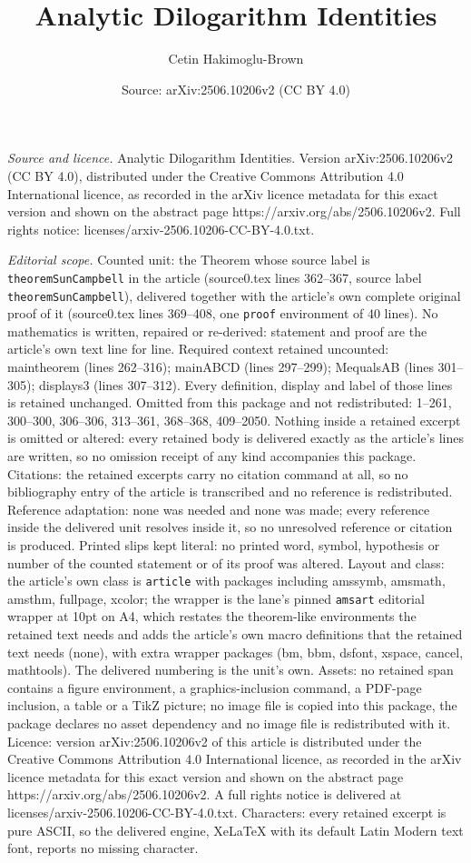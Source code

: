 \documentclass[10pt,a4paper]{amsart}
\title[Analytic Dilogarithm Identities]{Analytic Dilogarithm Identities}
\author{Cetin Hakimoglu-Brown}
\date{Source: arXiv:2506.10206v2 (CC BY 4.0)}
\begin{document}
\maketitle

\noindent\emph{Source and licence.} Analytic Dilogarithm Identities. Version arXiv:2506.10206v2 (CC BY 4.0), distributed under the Creative Commons Attribution 4.0 International licence, as recorded in the arXiv licence metadata for this exact version and shown on the abstract page https://arxiv.org/abs/2506.10206v2. Full rights notice: licenses/arxiv-2506.10206-CC-BY-4.0.txt.\par\smallskip

\noindent\textit{Editorial scope.} Counted unit: the Theorem whose source label is \texttt{theoremSunCampbell} in the article (source0.tex lines 362--367, source label \texttt{theoremSunCampbell}), delivered together with the article's own complete original proof of it (source0.tex lines 369--408, one \texttt{proof} environment of 40 lines). No mathematics is written, repaired or re-derived: statement and proof are the article's own text line for line. Required context retained uncounted: maintheorem (lines 262--316); mainABCD (lines 297--299); MequalsAB (lines 301--305); displays3 (lines 307--312). Every definition, display and label of those lines is retained unchanged. Omitted from this package and not redistributed: 1--261, 300--300, 306--306, 313--361, 368--368, 409--2050. Nothing inside a retained excerpt is omitted or altered: every retained body is delivered exactly as the article's lines are written, so no omission receipt of any kind accompanies this package. Citations: the retained excerpts carry no citation command at all, so no bibliography entry of the article is transcribed and no reference is redistributed. Reference adaptation: none was needed and none was made; every reference inside the delivered unit resolves inside it, so no unresolved reference or citation is produced. Printed slips kept literal: no printed word, symbol, hypothesis or number of the counted statement or of its proof was altered. Layout and class: the article's own class is \texttt{article} with packages including amssymb, amsmath, amsthm, fullpage, xcolor; the wrapper is the lane's pinned \texttt{amsart} editorial wrapper at 10pt on A4, which restates the theorem-like environments the retained text needs and adds the article's own macro definitions that the retained text needs (none), with extra wrapper packages (bm, bbm, dsfont, xspace, cancel, mathtools). The delivered numbering is the unit's own. Assets: no retained span contains a figure environment, a graphics-inclusion command, a PDF-page inclusion, a table or a TikZ picture; no image file is copied into this package, the package declares no asset dependency and no image file is redistributed with it. Licence: version arXiv:2506.10206v2 of this article is distributed under the Creative Commons Attribution 4.0 International licence, as recorded in the arXiv licence metadata for this exact version and shown on the abstract page https://arxiv.org/abs/2506.10206v2. A full rights notice is delivered at licenses/arxiv-2506.10206-CC-BY-4.0.txt. Characters: every retained excerpt is pure ASCII, so the delivered engine, XeLaTeX with its default Latin Modern text font, reports no missing character.
\end{document}
